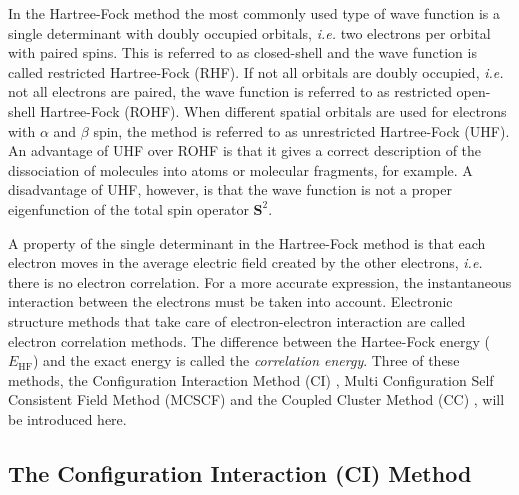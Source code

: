 In the Hartree-Fock method the most commonly used type of wave function is a single determinant with doubly occupied orbitals, \textit{i.e.} two electrons per orbital with paired spins. This is referred to as closed-shell and the wave function is called restricted Hartree-Fock (RHF). If not all orbitals are doubly occupied, \textit{i.e.} not all electrons are paired, the wave function is referred to as restricted open-shell Hartree-Fock (ROHF). When different spatial orbitals are used for electrons with $\alpha$ and $\beta$ spin, the method is referred to as unrestricted Hartree-Fock (UHF). An advantage of UHF over ROHF is that it gives a correct description of the dissociation of molecules into atoms or molecular fragments, for example. A disadvantage of UHF, however, is that the wave function is not a proper eigenfunction of the total spin operator $\mathbf{S}^2$.

A property of the single determinant in the Hartree-Fock method is that each electron moves in the average electric field created by the other electrons, \textit{i.e.} there is no electron correlation. For a more accurate expression, the instantaneous interaction between the electrons must be taken into account. Electronic structure methods that take care of electron-electron interaction are called electron correlation methods. The difference between the Hartee-Fock energy ($E_\mathrm{HF}$) and the exact energy is called the \textit{correlation energy}. Three of these methods, the Configuration Interaction Method (CI) \cite{shavitt1,shavitt2}, Multi Configuration Self Consistent Field Method (MCSCF) \cite{daswahl,wahldasbook,mcscf,roos1,roos2} and the Coupled Cluster Method (CC) \cite{cc1,cc2}, will be introduced here.

\subsection{\label{ch1.sec.ci}The Configuration Interaction (CI) Method}

